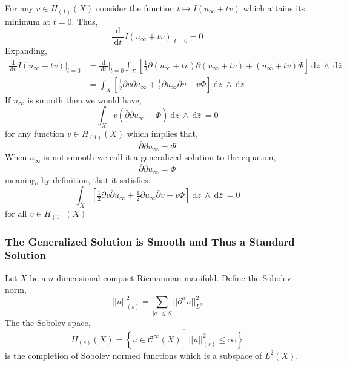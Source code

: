\documentclass[12pt]{extarticle}
\renewcommand{\d}[1]{\: \mathrm{d}#1 \:}
\newcommand{\deriv}[2]{\frac{\d{#1}}{\d{#2}}}
\theoremstyle{definition}
\newenvironment{definition}[1][Definition:]{\begin{trivlist}
\item[\hskip \labelsep {\bfseries #1}]}{\end{trivlist}}
\newcommand{\Class}[2]{\mathcal{C}^{#1} \left( #2 \right)}
\begin{document}
For any $v \in H_{(1)}(X)$ consider the function $t \mapsto I(u_{\infty} + t v)$ which attains its minimum at $t = 0$. Thus,
\[ \deriv{}{t} I(u_{\infty} + t v) \bigg|_{t = 0} = 0 \]
Expanding,
\begin{align*}
\deriv{}{t} I(u_{\infty} + t v) \bigg|_{t = 0} & = \deriv{}{t} \bigg|_{t = 0}\int_X  \left[  \tfrac{1}{2} \partial (u_{\infty} + t v) \bar{\partial} (u_{\infty} + t v) + (u_\infty + t v) \Phi \right] \d{z} \wedge \d{\bar{z}} 
\\
& = \int_X \left[  \tfrac{1}{2} \partial v \bar{\partial} u_{\infty} +  \tfrac{1}{2} \partial u_{\infty} \bar{\partial} v + v \Phi \right] \d{z} \wedge \d{\bar{z}} 
\end{align*}
If $u_{\infty}$ is smooth then we would have,
\[ \int_X v \left( \bar{\partial} \partial u_{\infty} - \Phi \right) \d{z} \wedge \d{\bar{z}} = 0 \]
for any function $v \in H_{(1)}(X)$ which implies that,
\[ \bar{\partial} \partial u_{\infty} = \Phi \]
When $u_{\infty}$ is not smooth we call it a generalized solution to the equation,
\[ \bar{\partial} \partial u_{\infty} = \Phi \]
meaning, by definition, that it satisfies,
\[ \int_X \left[  \tfrac{1}{2} \partial v \bar{\partial} u_{\infty} +  \tfrac{1}{2} \partial u_{\infty} \bar{\partial} v + v \Phi \right] \d{z} \wedge \d{\bar{z}}  = 0 \]
for all $v \in H_{(1)}(X)$ 

\subsubsection{The Generalized Solution is Smooth and Thus a Standard Solution}

\begin{definition}
Let $X$ be a $n$-dimensional compact Riemannian manifold. 
Define the Sobolev norm,
\[ ||u||_{(s)}^2 = \sum_{|\alpha| \le S} || \partial^\alpha u ||^2_{L^2} \]
The the Sobolev space,
\[ H_{(s)}(X) = \overline{ \left\{ u \in \Class{\infty}{X} \mid ||u||^2_{(s)} \le \infty \right\} } \]
is the completion of Sobolev normed functions which is a subspace of $L^2(X)$. 
\end{definition}
\end{document}

